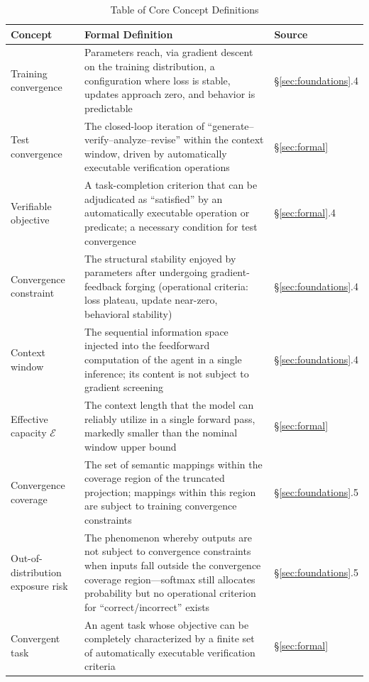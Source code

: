 \documentclass[11pt,a4paper]{article}
\theoremstyle{definition}
\newcommand{\effcap}{\mathcal{E}}
\begin{document}
\begin{table}[H]
\centering
\caption{Table of Core Concept Definitions}
\begin{tabular}{@{}p{2.8cm}p{5.2cm}p{4cm}@{}}
\toprule
\textbf{Concept} & \textbf{Formal Definition} & \textbf{Source} \\
\midrule
Training convergence & Parameters reach, via gradient descent on the training distribution, a configuration where loss is stable, updates approach zero, and behavior is predictable & \S\ref{sec:foundations}.4 \\
Test convergence & The closed-loop iteration of ``generate--verify--analyze--revise'' within the context window, driven by automatically executable verification operations & \S\ref{sec:formal} \\
Verifiable objective & A task-completion criterion that can be adjudicated as ``satisfied'' by an automatically executable operation or predicate; a necessary condition for test convergence & \S\ref{sec:formal}.4 \\
Convergence constraint & The structural stability enjoyed by parameters after undergoing gradient-feedback forging (operational criteria: loss plateau, update near-zero, behavioral stability) & \S\ref{sec:foundations}.4 \\
Context window & The sequential information space injected into the feedforward computation of the agent in a single inference; its content is not subject to gradient screening & \S\ref{sec:foundations}.4 \\
Effective capacity $\effcap$ & The context length that the model can reliably utilize in a single forward pass, markedly smaller than the nominal window upper bound & \S\ref{sec:formal} \\
Convergence coverage & The set of semantic mappings within the coverage region of the truncated projection; mappings within this region are subject to training convergence constraints & \S\ref{sec:foundations}.5 \\
Out-of-distribution exposure risk & The phenomenon whereby outputs are not subject to convergence constraints when inputs fall outside the convergence coverage region---softmax still allocates probability but no operational criterion for ``correct/incorrect'' exists & \S\ref{sec:foundations}.5 \\
Convergent task & An agent task whose objective can be completely characterized by a finite set of automatically executable verification criteria & \S\ref{sec:formal} \\

\end{tabular}
\end{table}
\end{document}
